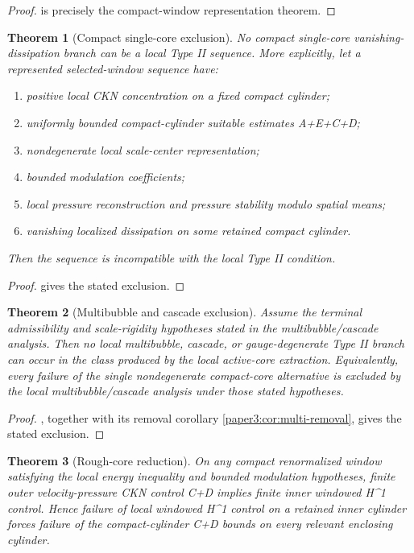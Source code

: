 \documentclass[11pt]{amsart}
\def\({}%
\def\){}%
\theoremstyle{plain}
\newtheorem{theorem}{Theorem}[section]
\theoremstyle{definition}
\theoremstyle{remark}
\begin{document}
\begin{proof}
 is precisely the compact-window representation theorem.
\end{proof}

\begin{theorem}[Compact single-core exclusion]
\label{paper6:thm:single-core}
No compact single-core vanishing-dissipation branch can be a local Type II
sequence.  More explicitly, let a represented selected-window sequence have:
\begin{enumerate}[label=\textup{(\roman*)}]
\item positive local CKN concentration on a fixed compact cylinder;
\item uniformly bounded compact-cylinder suitable estimates \(A+E+C+D\);
\item nondegenerate local scale-center representation;
\item bounded modulation coefficients;
\item local pressure reconstruction and pressure stability modulo spatial
means;
\item vanishing localized dissipation on some retained compact cylinder.
\end{enumerate}
Then the sequence is incompatible with the local Type II condition.
\end{theorem}

\begin{proof}
 gives the stated exclusion.
\end{proof}

\begin{theorem}[Multibubble and cascade exclusion]
\label{paper6:thm:multibubble}
Assume the terminal admissibility and scale-rigidity hypotheses stated in the
multibubble/cascade analysis.
Then no local multibubble, cascade, or gauge-degenerate Type II branch can occur
in the class produced by the local active-core extraction.  Equivalently, every
failure of the single nondegenerate compact-core alternative is excluded by the
local multibubble/cascade analysis under those stated hypotheses.
\end{theorem}

\begin{proof}
, together with its removal corollary
\cref{paper3:cor:multi-removal}, gives the stated exclusion.
\end{proof}

\begin{theorem}[Rough-core reduction]
\label{paper6:thm:rough-core}
On any compact renormalized window satisfying the local energy inequality and
bounded modulation hypotheses, finite outer velocity-pressure CKN control
\(\mathcal C+\mathcal D\) implies finite inner windowed \(H^1\) control.  Hence
failure of local windowed \(H^1\) control on a retained inner cylinder forces
failure of the compact-cylinder \(\mathcal C+\mathcal D\) bounds on every
relevant enclosing cylinder.
\end{theorem}
\end{document}
